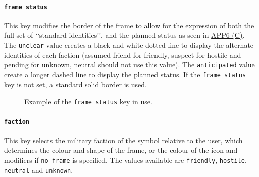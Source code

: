 \documentclass[a4paper, titlepage]{article}
\newcommand\DocLink{\href{https://web.archive.org/web/20150921231042/http://armawiki.zumorc.de/files/NATO/APP-6(C).pdf}{APP6-(C)}}
\begin{document}
\paragraph{\texttt{frame status}}

This key modifies the border of the frame to allow for the expression of both the full set of \lq\lq{}standard identities\rq\rq{}, and the planned status as seen in \DocLink. The \texttt{unclear} value creates a black and white dotted line to display the alternate identities of each faction (assumed friend for friendly, suspect for hostile and pending for unknown, neutral should not use this value). The \texttt{anticipated} value create a longer dashed line to display the planned status. If the \texttt{frame status} key is not set, a standard solid border is used.

\begin{figure}[H]
\centering
{}
\caption{Example of the \texttt{frame status} key in use.}
\end{figure}


\paragraph{\texttt{faction}}

This key selects the military faction of the symbol relative to the user, which determines the colour and shape of the frame, or the colour of the icon and modifiers if \texttt{no frame} is specified. The values available are \texttt{friendly}, \texttt{hostile}, \texttt{neutral} and \texttt{unknown}.
\end{document}

